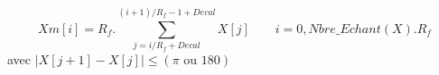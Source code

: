 \[
Xm[i] = R_f . \sum_{j = i/R_f + Decal}^{(i+1)/R_f -1 + Decal} X[j]
\qquad i=0,Nbre\_Echant(X). R_f
\]
avec $|X[j+1] - X[j]| \leq (\pi \text{ ou } 180)$

